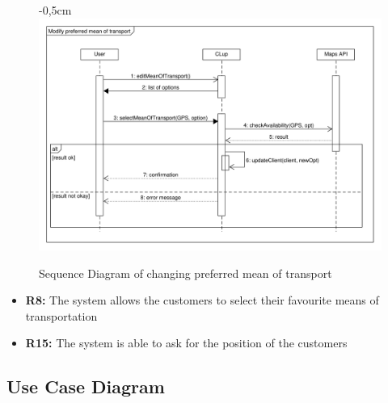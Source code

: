 \documentclass{article}
\begin{document}
\begin{center}
					\begin{figure}[!htb]
						\begin{adjustwidth} {-0,5cm}{}
							\centering
							\includegraphics[scale=0.42]{SD/12_selectPreferredMeanOfTransport.pdf}\\
							\caption{Sequence Diagram of changing preferred mean of transport}
						\end{adjustwidth}

					\end{figure}
					
					
					\begin{itemize}
						\medskip
						\newpage
						{\bfseries Required functional requirements: }
						
						
						\item {\bfseries R8: } The system allows the customers to select their favourite means of transportation
						\item {\bfseries R15: } The system is able to ask for the position of the customers
											
						
					\end{itemize}
				\end{center}
		
		\subsection{Use Case Diagram}
		
\end{document}
